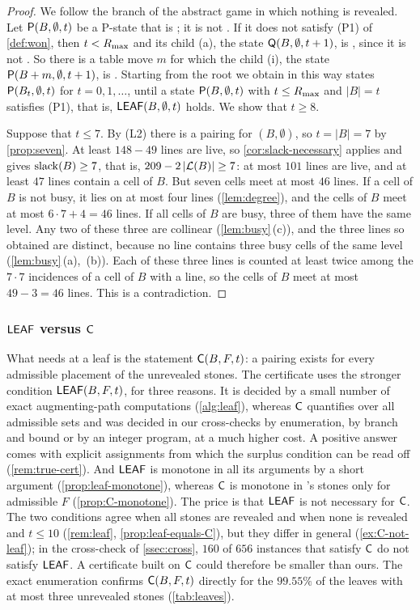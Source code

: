 \begin{proof}
We follow the branch of the abstract game in which nothing is revealed. Let $\mathsf{P}(B,\emptyset,t)$ be a
P-state that is \WON; it is not \VOID. If it does not satisfy (P1) of \cref{def:won}, then $t<R_{\max}$ and
its child \textup{(a)}, the state $\mathsf{Q}(B,\emptyset,t+1)$, is \WON, since it is not \VOID. So there is
a table move $m$ for which the child \textup{(i)}, the state $\mathsf{P}(B+m,\emptyset,t+1)$, is \WON.
Starting from the root we obtain in this way \WON{} states $\mathsf{P}(B_t,\emptyset,t)$ for $t=0,1,\dots$,
until a state $\mathsf{P}(B,\emptyset,t)$ with $t\le R_{\max}$ and $|B|=t$ satisfies (P1), that is,
$\mathsf{LEAF}(B,\emptyset,t)$ holds. We show that $t\ge 8$.

Suppose that $t\le 7$. By (L2) there is a pairing for $(B,\emptyset)$, so $t=|B|=7$ by
\cref{prop:seven}. At least $148-49$ lines are live, so \cref{cor:slack-necessary} applies and gives
$\operatorname{slack}(B)\ge 7$, that is, $209-2\,|\mathcal{L}(B)|\ge 7$: at most $101$ lines are live, and at least $47$ lines
contain a cell of $B$. But seven cells meet at most $46$ lines. If a cell of $B$ is not busy, it lies on
at most four lines (\cref{lem:degree}), and the cells of $B$ meet at most $6\cdot 7+4=46$ lines. If all
cells of $B$ are busy, three of them have the same level. Any two of these three are collinear
(\cref{lem:busy}\,(c)), and the three lines so obtained are distinct, because no line contains three
busy cells of the same level (\cref{lem:busy}\,(a),~(b)). Each of these three lines is counted at least
twice among the $7\cdot 7$ incidences of a cell of $B$ with a line, so the cells of $B$ meet at most
$49-3=46$ lines. This is a contradiction.
\end{proof}

\subsubsection*{$\mathsf{LEAF}$ versus $\mathsf{C}$}
What \Breaker{} needs at a leaf is the statement $\mathsf{C}(B,F,t)$: a pairing exists for every admissible
placement of the unrevealed stones. The certificate uses the stronger condition $\mathsf{LEAF}(B,F,t)$, for
three reasons. It is decided by a small number of exact augmenting-path computations
(\cref{alg:leaf}), whereas $\mathsf{C}$ quantifies over all admissible sets and was decided in our
cross-checks by enumeration, by branch and bound or by an integer program, at a much higher cost. A positive
answer comes with explicit assignments from which the surplus condition can be read off
(\cref{rem:true-cert}). And $\mathsf{LEAF}$ is monotone in all its arguments by a short argument
(\cref{prop:leaf-monotone}), whereas $\mathsf{C}$ is monotone in \Breaker's stones only for admissible $F$
(\cref{prop:C-monotone}). The price is that $\mathsf{LEAF}$ is not necessary for $\mathsf{C}$. The two conditions
agree when all stones are revealed and when none is revealed and $t\le 10$
(\cref{rem:leaf}, \cref{prop:leaf-equals-C}), but they differ in general (\cref{ex:C-not-leaf}); in the
cross-check of \cref{ssec:cross}, $160$ of $656$ instances that satisfy $\mathsf{C}$ do not satisfy $\mathsf{LEAF}$. A
certificate built on $\mathsf{C}$ could therefore be smaller than ours. The exact enumeration confirms
$\mathsf{C}(B,F,t)$ directly for the $99.55\%$ of the leaves with at most three unrevealed stones
(\cref{tab:leaves}).

